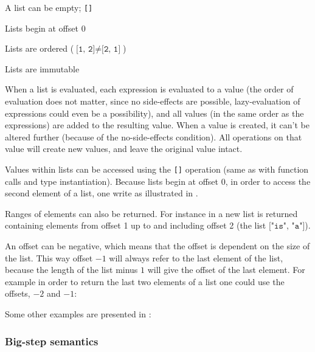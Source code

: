 \begin{nlist}
\item A list can be empty; \texttt{[]}
\item Lists begin at offset $0$
\item Lists are ordered ($\texttt{[1, 2]} \ne \texttt{[2, 1]}$)
\item Lists are immutable
\end{nlist}

When a list is evaluated, each expression is evaluated to a value (the order of
evaluation does not matter, since no side-effects are possible, lazy-evaluation
of expressions could even be a possibility), and all values (in the same order
as the expressions) are added to the resulting  value. When a
 value is created, it can't be altered further (because of the
no-side-effects condition). All operations on that  value will create
new  values, and leave the original value intact.

Values within lists can be accessed using the \texttt{[]} operation (same as
with function calls and type instantiation). Because lists begin at offset $0$, in
order to access the second element of a list, one write as illustrated in
.


Ranges of elements can also be returned. For instance in
 a new list is returned containing elements from offset 1 up
to and including offset 2 (the list $\texttt{["is", "a"]}$).


An offset can be negative, which means that the offset is dependent on
the size of the list. This way offset $-1$ will always refer to the last element
of the list, because the length of the list minus $1$ will give the offset of
the last element. For example in order to return the last two elements of a list one
could use the offsets, $-2$ and $-1$:


Some other examples are presented in :


\subsubsection{Big-step semantics}

